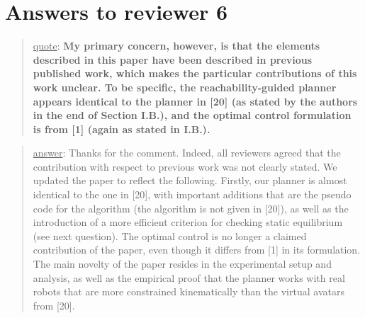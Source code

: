 \documentclass[a4paper]{article}
\newcommand\quot[1]{\begin{quote} \underline{quote}: \textbf{#1}\end{quote}}
\newcommand\as[1]{\begin{quote} \underline{answer}: {#1}\end{quote} }
\begin{document}
\section{Answers to reviewer 6}
\quot{ My primary concern, however,
is that the elements described in this paper have been described in
previous published work, which makes the particular contributions of
this work unclear. To be specific, the reachability-guided planner
appears identical to the planner in [20] (as stated by the authors in
the end of Section I.B.), and the optimal control formulation is from [1]
(again as stated in I.B.).}
\as{Thanks for the comment. Indeed, all reviewers agreed that the contribution with respect to previous work was not clearly stated. We updated the paper to reflect the following. Firstly, our planner is almost identical to the one in [20], with important additions that are the pseudo code for the algorithm (the algorithm is not given in [20]), as well as the introduction of a more efficient criterion
for checking static equilibrium (see next question). The optimal control is no longer a claimed contribution of the paper, even though it differs from [1] in its formulation. The main
novelty of the paper resides in the experimental setup and analysis, as well as the empirical proof that the planner works with real robots that are more constrained kinematically than the virtual avatars from [20].}
\end{document}
